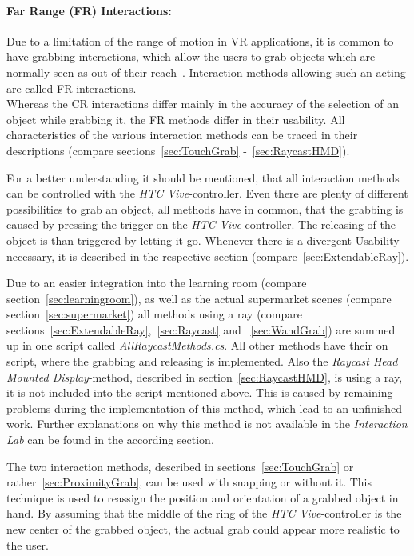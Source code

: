 \paragraph{Far Range (FR) Interactions:} Due to a limitation of the range of motion in VR applications, it is common to have grabbing interactions, which allow the users to grab objects which are normally seen as out of their reach~\cite{VRBook}. Interaction methods allowing such an acting are called FR interactions. \\

Whereas the CR interactions differ mainly in the accuracy of the selection of an object while grabbing it, the FR methods differ in their usability. All characteristics of the various interaction methods can be traced in their descriptions (compare sections~\ref{sec:TouchGrab} -~\ref{sec:RaycastHMD}).

For a better understanding it should be mentioned, that all interaction methods can be controlled with the \textit{HTC Vive}-controller. Even there are plenty of different possibilities to grab an object, all methods have in common, that the grabbing is caused by pressing the trigger on the \textit{HTC Vive}-controller. The releasing of the object is than triggered by letting it go. Whenever there is a divergent Usability necessary, it is described in the respective section (compare~\ref{sec:ExtendableRay}).

Due to an easier integration into the learning room (compare section~\ref{sec:learningroom}), as well as the actual supermarket scenes (compare section~\ref{sec:supermarket}) all methods using a ray (compare sections~\ref{sec:ExtendableRay},~\ref{sec:Raycast} and ~\ref{sec:WandGrab}) are summed up in one script called \textit{AllRaycastMethods.cs}. All other methods have their on script, where the grabbing and releasing is implemented. Also the \textit{Raycast Head Mounted Display}-method, described in section~\ref{sec:RaycastHMD}, is using a ray, it is not included into the script mentioned above. This is caused by remaining problems during the implementation of this method, which lead to an unfinished work. Further explanations on why this method is not available in the \textit{Interaction Lab} can be found in the according section.

The two interaction methods, described in sections~\ref{sec:TouchGrab} or rather~\ref{sec:ProximityGrab}, can be used with snapping or without it. This technique is used to reassign the position and orientation of a grabbed object in hand. By assuming that the middle of the ring of the \textit{HTC Vive}-controller is the new center of the grabbed object, the actual grab could appear more realistic to the user. 

